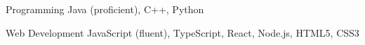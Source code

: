 

\begin{cvskills}

  \cvskill
    {Programming} %
    {Java (proficient), C++, Python} %
    
  \cvskill
    {Web Development} %
    {JavaScript (fluent), TypeScript, React, Node.js, HTML5, CSS3} %

\end{cvskills}
